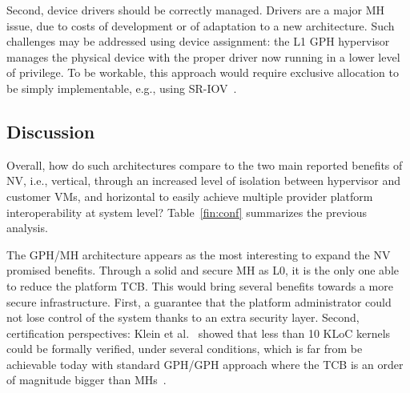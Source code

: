 \documentclass{sig-alternate}
\begin{document}
Second, device drivers should be correctly managed. Drivers are a major MH issue, due to costs of development or of adaptation to a new architecture. Such challenges may be addressed using device assignment: the L1 GPH hypervisor manages the physical device with the proper driver now running in a lower level of privilege. To be workable, this approach would require exclusive allocation to be simply implementable, e.g., using SR-IOV~\cite{sriov}.

\subsection{Discussion}

\noindent Overall, how do such architectures compare to the two main reported benefits of NV, i.e., vertical, through an increased level of isolation between hypervisor and customer VMs, and horizontal to easily achieve multiple provider platform interoperability at system level? Table~\ref{fin:conf} summarizes the previous analysis. 

The GPH/MH architecture appears as the most interesting to expand the NV promised benefits. Through a solid and secure MH as L0, it is the only one able to reduce the platform TCB. This would bring several benefits towards a more secure infrastructure. First, a guarantee that the platform administrator could not lose control of the system thanks to an extra security layer. Second, certification perspectives: Klein et al.~\cite{Klein:2009} showed that less than 10 KLoC kernels could be formally verified, under several conditions, which is far from be achievable today with standard GPH/GPH approach where the TCB is an order of 
magnitude bigger than MHs~\cite{nova}.
\end{document}
